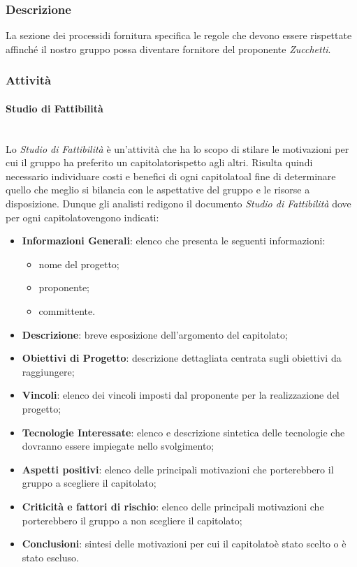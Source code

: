 \subsubsection{Descrizione}
La sezione dei processi\glosp di fornitura specifica le regole che devono essere rispettate affinché il nostro gruppo possa diventare fornitore del proponente \textit{Zucchetti}.
\subsubsection{Attività}
\paragraph{Studio di Fattibilità}\mbox{}\\ [1mm]
Lo \textit{Studio di Fattibilità} è un'attività che ha lo scopo di stilare le motivazioni per cui il gruppo ha preferito un capitolato\glosp rispetto agli altri.
Risulta quindi necessario individuare costi e benefici di ogni capitolato\glosp al fine di determinare quello che meglio si bilancia con le aspettative del gruppo e le risorse a disposizione.
Dunque gli analisti redigono il documento \textit{Studio di Fattibilità} dove per ogni capitolato\glosp vengono indicati:
\begin{itemize}
	\item \textbf{Informazioni Generali}: elenco che presenta le seguenti informazioni: 
	\begin{itemize}
		\item nome del progetto\glo;
		\item proponente;
		\item committente.
	\end{itemize} 
	\item \textbf{Descrizione}: breve esposizione dell'argomento del capitolato\glo;
	\item \textbf{Obiettivi di Progetto}: descrizione dettagliata centrata sugli obiettivi da raggiungere;
	\item \textbf{Vincoli}: elenco dei vincoli imposti dal proponente per la realizzazione del progetto\glo;
	\item \textbf{Tecnologie Interessate}: elenco e descrizione sintetica delle tecnologie che dovranno essere impiegate nello svolgimento;
	\item \textbf{Aspetti positivi}: elenco delle principali motivazioni che porterebbero il gruppo a scegliere il capitolato\glo;
	\item \textbf{Criticità e fattori di rischio}: elenco delle principali motivazioni che porterebbero il gruppo a non scegliere il capitolato\glo;
	\item \textbf{Conclusioni}: sintesi delle motivazioni per cui il capitolato\glosp è stato scelto o è stato escluso.
\end{itemize}
